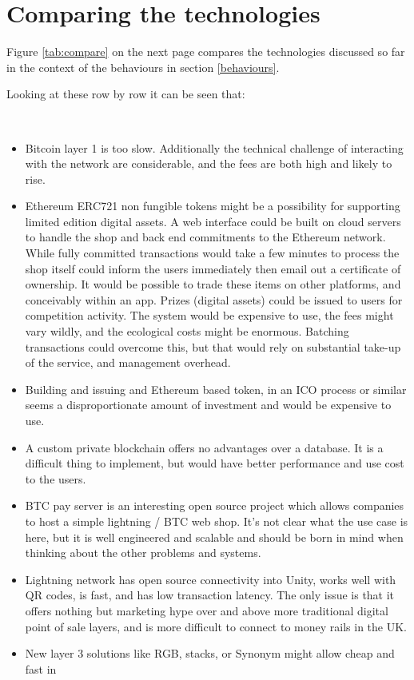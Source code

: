 \section{Comparing the technologies}
Figure \ref{tab:compare} on the next page compares the technologies discussed so far in the context of the behaviours in section \ref{behaviours}. \par
Looking at these row by row it can be seen that:\par\
\begin{itemize}
\item Bitcoin layer 1 is too slow. Additionally the technical challenge of interacting with the network are considerable, and the fees are both high and likely to rise.
\item Ethereum ERC721 non fungible tokens might be a possibility for supporting limited edition digital assets. A web interface could be built on cloud servers to handle the shop and back end commitments to the Ethereum network. While fully committed transactions would take a few minutes to process the shop itself could inform the users immediately then email out a certificate of ownership. It would be possible to trade these items on other platforms, and conceivably within an app. Prizes (digital assets) could be issued to users for competition activity. The system would be expensive to use, the fees might vary wildly, and the ecological costs might be enormous. Batching transactions could overcome this, but that would rely on substantial take-up of the service, and management overhead.
\item Building and issuing and Ethereum based token, in an ICO process or similar seems a disproportionate amount of investment and would be expensive to use. 
\item A custom private blockchain offers no advantages over a database. It is a difficult thing to implement, but would have better performance and use cost to the users.
\item BTC pay server is an interesting open source project which allows companies to host a simple lightning / BTC web shop. It's not clear what the use case is here, but it is well engineered and scalable and should be born in mind when thinking about the other problems and systems.
\item Lightning network has open source connectivity into Unity, works well with QR codes, is fast, and has low transaction latency. The only issue is that it offers nothing but marketing hype over and above more traditional digital point of sale layers, and is more difficult to connect to money rails in the UK.
\item New layer 3 solutions like RGB, stacks, or Synonym might allow cheap and fast in
\end{itemize}

